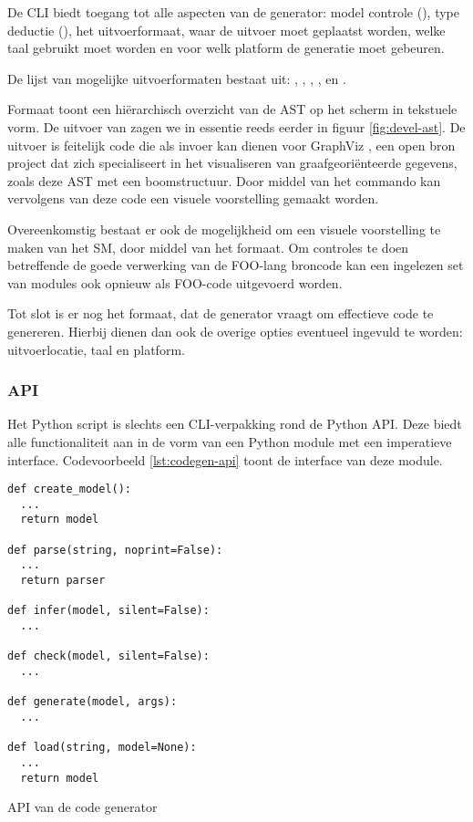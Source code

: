 De CLI biedt toegang tot alle aspecten van de generator: model controle
(), type deductie (), het uitvoerformaat, waar de uitvoer
moet geplaatst worden, welke taal gebruikt moet worden en voor welk platform de
generatie moet gebeuren.

De lijst van mogelijke uitvoerformaten bestaat uit: , ,
, ,  en .

Formaat  toont een hi\"erarchisch overzicht van de AST op het scherm
in tekstuele vorm. De uitvoer van  zagen we in essentie reeds
eerder in figuur \ref{fig:devel-ast}. De uitvoer is feitelijk code die als
invoer kan dienen voor GraphViz \citep{url:graphviz}, een open bron project dat
zich specialiseert in het visualiseren van graafgeori\"enteerde gegevens, zoals
deze AST met een boomstructuur. Door middel van het  commando kan
vervolgens van deze code een visuele voorstelling gemaakt worden.

Overeenkomstig bestaat er ook de mogelijkheid om een visuele voorstelling te
maken van het SM, door middel van het  formaat. Om controles te
doen betreffende de goede verwerking van de FOO-lang broncode kan een ingelezen
set van modules ook opnieuw als FOO-code uitgevoerd worden.

Tot slot is er nog het  formaat, dat de generator vraagt om
effectieve code te genereren. Hierbij dienen dan ook de overige opties
eventueel ingevuld te worden: uitvoerlocatie, taal en platform.

\subsubsection{API}

Het  Python script is slechts een CLI-verpakking rond de Python
API. Deze biedt alle functionaliteit aan in de vorm van een Python module met
een imperatieve interface. Codevoorbeeld \ref{lst:codegen-api} toont de interface
van deze module.

\begin{listing}[ht]
  \begin{verbatim}
def create_model():
  ...
  return model

def parse(string, noprint=False):
  ...
  return parser

def infer(model, silent=False):
  ...

def check(model, silent=False):
  ...

def generate(model, args):
  ...

def load(string, model=None):
  ...
  return model
  \end{verbatim}
  \vspace{-5mm}
  \caption{API van de code generator}
  \label{lst:codegen-api}
\end{listing}


